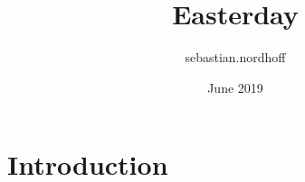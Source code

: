 \documentclass{article}
\title{Easterday}
\author{sebastian.nordhoff }
\date{June 2019}
\begin{document}
\maketitle

\section{Introduction}
\end{document}
